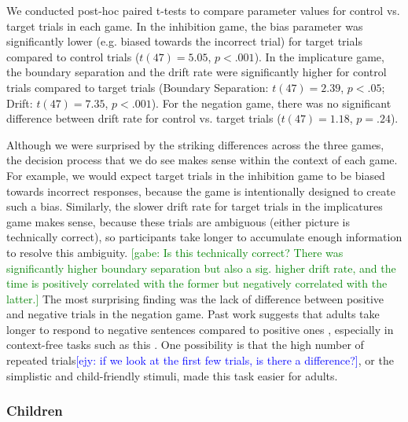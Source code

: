 \documentclass[10pt,letterpaper]{article}
\newcommand{\ejy}[1]{\textcolor{Blue}{[ejy: #1]}}  %
\newcommand{\gabe}[1]{\textcolor{Green}{[gabe: #1]}}
\begin{document}
We conducted post-hoc paired t-tests to compare parameter values for control vs. target trials in each game.  In the inhibition game, the bias parameter was significantly lower (e.g. biased towards the incorrect trial) for target trials compared to control trials ($t(47) = 5.05$, $p< .001$).  In the implicature game, the boundary separation and the drift rate were significantly higher for control trials compared to target trials (Boundary Separation: $t(47) = 2.39$, $p< .05$; Drift: $t(47) = 7.35$, $p< .001$).  For the negation game, there was no significant difference between drift rate for control vs. target trials ($t(47) = 1.18$, $p = .24$).  

Although we were surprised by the striking differences across the three games, the decision process that we do see makes sense within the context of each game.  For example, we would expect target trials in the inhibition game to be biased towards incorrect responses, because the game is intentionally designed to create such a bias.  Similarly, the slower drift rate for target trials in the implicatures game makes sense, because these trials are ambiguous (either picture is technically correct), so participants take longer to accumulate enough information to resolve this ambiguity. \gabe{Is this technically correct? There was  significantly higher boundary separation but also a sig. higher drift rate, and the time is positively correlated with the former but negatively correlated with the latter.} The most surprising finding was the lack of difference between positive and negative trials in the negation game.  Past work suggests that adults take longer to respond to negative sentences compared to positive ones \cite{hclark1972}, especially in context-free tasks such as this \cite{nordmeyer2014a}.  One possibility is that the high number of repeated trials\ejy{if we look at the first few trials, is there a difference?}, or the simplistic and child-friendly stimuli, made this task easier for adults.

\subsubsection{Children}
\end{document}
